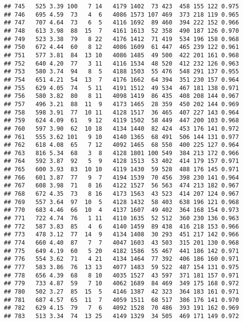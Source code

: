 \documentclass[]{article}
\begin{document}
\begin{verbatim}
## 745   525 3.39 100   7 14   4179 1402  73 423  458 155 122 0.975
## 746   695 4.59  73   4  6   4086 1573 107 469  373 218 119 0.965
## 747   707 4.64  73   6  5   4116 1692  89 460  394 222 152 0.966
## 748   613 3.98  88  15  7   4161 1613  52 358  490 187 126 0.970
## 749   523 3.38  79   8 22   4176 1412  71 419  534 196 158 0.968
## 750   672 4.44  60   8 12   4086 1609  61 447  465 239 122 0.961
## 751   577 3.81  84  13 10   4086 1485  49 500  422 201 161 0.968
## 752   640 4.20  77   3 11   4116 1534  48 520  412 232 126 0.963
## 753   580 3.74  94   8  5   4188 1503  55 476  548 291 137 0.955
## 754   651 4.21  54  13  7   4176 1662  64 394  351 230 157 0.964
## 755   629 4.05  74   5 11   4191 1512  49 534  467 181 138 0.971
## 756   580 3.82  80   8 11   4098 1419  86 435  408 208 144 0.967
## 757   496 3.21  88  11  9   4173 1465  28 359  450 202 144 0.969
## 758   598 3.91  77  10 11   4128 1517  36 465  407 227 143 0.964
## 759   624 4.09  61   9 12   4119 1502  58 449  447 200 103 0.968
## 760   597 3.90  62  10 18   4134 1440  82 424  453 176 141 0.972
## 761   555 3.62 101   9 10   4140 1365  68 491  506 144 131 0.977
## 762   618 4.08  65   7 12   4092 1465  68 550  400 225 127 0.964
## 763   816 5.34  68   3  8   4128 1801 100 549  384 213 172 0.966
## 764   592 3.87  92   5  9   4128 1513  53 402  414 179 157 0.971
## 765   600 3.93  83  10 10   4119 1430  59 528  488 176 145 0.971
## 766   601 3.87  77   9  7   4194 1539  70 456  398 230 141 0.964
## 767   608 3.98  71   8 16   4122 1527  56 563  474 213 182 0.967
## 768   672 4.35  73   8 16   4173 1563  43 523  414 207 124 0.967
## 769   557 3.64  97  10  5   4128 1432  58 403  638 196 121 0.968
## 770   683 4.46  66  10  4   4137 1607  49 402  364 168 154 0.973
## 771   722 4.74  76   1 11   4110 1635  52 512  360 230 136 0.963
## 772   587 3.83  85   4  6   4140 1459  89 438  416 218 153 0.966
## 773   478 3.12  77  14  9   4134 1408  30 293  451 217 142 0.966
## 774   660 4.40  87   7  7   4047 1603  43 503  315 201 130 0.968
## 775   649 4.19  60   5 20   4182 1586  55 467  441 186 142 0.971
## 776   554 3.62  71   4 21   4134 1464  77 392  406 186 160 0.971
## 777   583 3.86  76  13 13   4077 1483  59 522  487 154 131 0.975
## 778   656 4.39  68   8 10   4035 1527  43 597  371 181 157 0.971
## 779   733 4.87  59   7 10   4062 1689  84 469  349 175 168 0.972
## 780   502 3.27  85  15  5   4146 1387  42 323  364 183 161 0.971
## 781   687 4.57  65  11  7   4059 1511  68 517  386 176 141 0.970
## 782   629 4.15  79   7  6   4092 1528  70 486  393 191 162 0.969
## 783   513 3.34  74  13 25   4149 1329  34 505  469 171 149 0.972

\end{verbatim}
\end{document}
